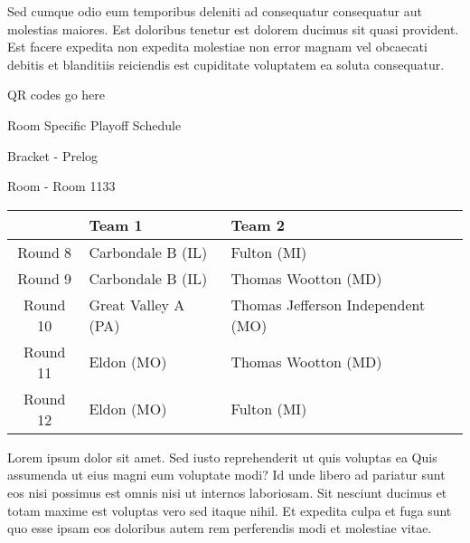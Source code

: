 \documentclass{article}%
\begin{document}
\newline%
Sed cumque odio eum temporibus deleniti ad consequatur consequatur aut molestias maiores. Est doloribus tenetur est dolorem ducimus sit quasi provident. Est facere expedita non expedita molestiae non error magnam vel obcaecati debitis et blanditiis reiciendis est cupiditate voluptatem ea soluta consequatur.%
\vspace*{140pt}%
\begin{center}%
\begin{Huge}%
QR codes go here%
\end{Huge}%
\end{center}%
\newpage%
\begin{center}%
\begin{Huge}%
Room Specific Playoff Schedule%
\end{Huge}%
\vspace*{8pt}%
\linebreak%
\begin{Large}%
Bracket {-} Prelog%
\end{Large}%
\vspace*{8pt}%
\linebreak%
\vspace*{8pt}%
\begin{Large}%
Room {-} Room 1133%
\end{Large}%
\end{center}%
%
\begin{tabularx}{\textwidth}{|c|Y|Y|}%
\hline%
&Team 1&Team 2\\%
\hline%
Round 8&Carbondale B (IL)&Fulton (MI)\\%
Round 9&Carbondale B (IL)&Thomas Wootton (MD)\\%
Round 10&Great Valley A (PA)&Thomas Jefferson Independent (MO)\\%
Round 11&Eldon (MO)&Thomas Wootton (MD)\\%
Round 12&Eldon (MO)&Fulton (MI)\\%
\hline%
\end{tabularx}%
\vspace*{8pt}%
\newline%
Lorem ipsum dolor sit amet. Sed iusto reprehenderit ut quis voluptas ea Quis assumenda ut eius magni eum voluptate modi? Id unde libero ad pariatur sunt eos nisi possimus est omnis nisi ut internos laboriosam. Sit nesciunt ducimus et totam maxime est voluptas vero sed itaque nihil. Et expedita culpa et fuga sunt quo esse ipsam eos doloribus autem rem perferendis modi et molestiae vitae.\newline%
\end{document}
